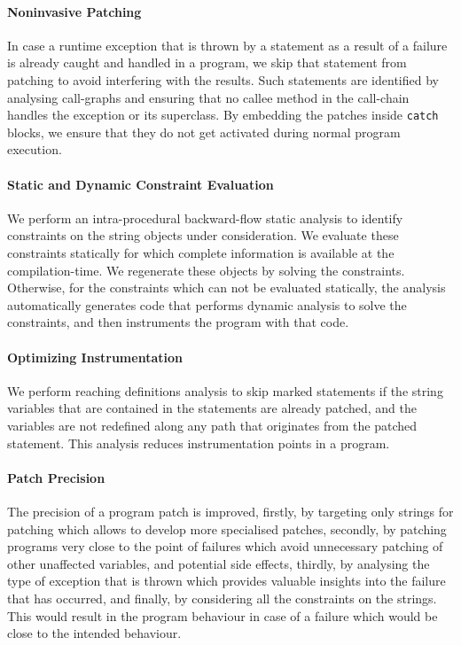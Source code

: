 \paragraph{Noninvasive Patching} In case a runtime exception that is thrown
by a statement as a result of a failure is already caught and handled in a program,
we skip that statement from patching to avoid interfering with the results. Such
statements are identified by analysing call-graphs and ensuring that no callee method
in the call-chain handles the exception or its superclass. By embedding the patches inside
\texttt{catch} blocks, we ensure that they do not get activated during normal program execution.

\paragraph{Static and Dynamic Constraint Evaluation} We perform an intra-procedural backward-flow static analysis
to identify constraints on the string objects under consideration. We evaluate these constraints
statically for which complete information is available at the compilation-time. We regenerate
these objects by solving the constraints. Otherwise, for the constraints which can not be
evaluated statically, the analysis automatically generates code that performs dynamic analysis
to solve the constraints, and then instruments the program with that code.

\paragraph{Optimizing Instrumentation} We perform reaching definitions analysis to skip marked statements
if the string variables that are contained in the statements are already patched, and the variables
are not redefined along any path that originates from the patched statement. This analysis reduces
instrumentation points in a program.

\paragraph{Patch Precision} The precision of a program patch is improved, firstly, by targeting only strings
for patching which allows to develop more specialised patches, secondly, by patching programs very
close to the point of failures which avoid unnecessary patching of other unaffected variables, and potential
side effects, thirdly, by analysing the type of exception that is thrown which provides valuable insights into
the failure that has occurred, and finally, by considering all the constraints on the strings. This would result
in the program behaviour in case of a failure which would be close to the intended behaviour.


